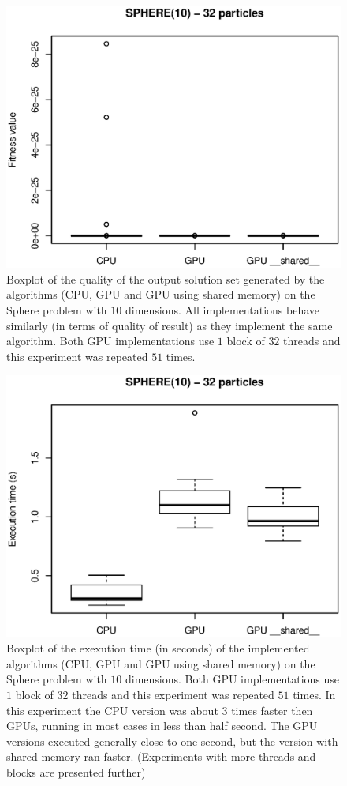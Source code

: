 \documentclass{article}
\begin{document}
    \begin{figure}[!htb]
        \centering
        \includegraphics[width=.7\textwidth]{../img/sphere10_32particles_fitness.eps}
        \caption{Boxplot of the quality of the output solution set generated by the algorithms (CPU, GPU and GPU using shared memory) on the Sphere problem with $10$ dimensions. All implementations behave similarly (in terms of quality of result) as they implement the same algorithm. Both GPU implementations use $1$ block of $32$ threads and this experiment was repeated $51$ times.}
        \label{fig:sphere10_32particles_fitness}
    \end{figure}


    \begin{figure}[!htb]
        \centering
        \includegraphics[width=.7\textwidth]{../img/sphere10_32particles_time.eps}
        \caption{Boxplot of the exexution time (in seconds) of the implemented algorithms (CPU, GPU and GPU using shared memory) on the Sphere problem with $10$ dimensions. Both GPU implementations use $1$ block of $32$ threads and this experiment was repeated $51$ times. In this experiment the CPU version was about $3$ times faster then GPUs, running in most cases in less than half second. The GPU versions executed generally close to one second, but the version with shared memory ran faster. (Experiments with more threads and blocks are presented further)}
        \label{fig:sphere10_32particles_time}
    \end{figure}
\end{document}
